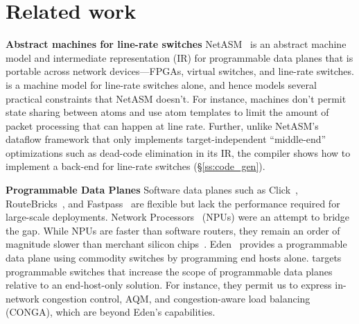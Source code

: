 \section{Related work}
\label{s:related}

\textbf{Abstract machines for line-rate switches}
NetASM~\cite{netasm} is an abstract machine model and intermediate
representation (IR) for programmable data planes that is portable across
network devices---FPGAs, virtual switches, and line-rate switches.  \absmachine
is a machine model for line-rate switches alone, and hence models several
practical constraints that NetASM doesn't. For instance, \absmachine machines
don't permit state sharing between atoms and use atom templates to limit the
amount of packet processing that can happen at line rate. Further, unlike
NetASM's dataflow framework that only implements target-independent
``middle-end'' optimizations such as dead-code elimination in its IR, the
\pktlanguage compiler shows how to implement a back-end for line-rate switches
(\S\ref{ss:code_gen}).

\textbf{Programmable Data Planes}
Software data planes such as Click~\cite{click},
RouteBricks~\cite{routebricks}, and Fastpass~\cite{fastpass} are flexible but
lack the performance required for large-scale deployments. Network
Processors~\cite{ixp2800, ixp4xx} (NPUs) were an attempt to bridge the gap.
While NPUs are faster than software routers, they remain an order of magnitude
slower than merchant silicon chips~\cite{rmt}. Eden~\cite{eden} provides a
programmable data plane using commodity switches by programming end hosts
alone. \pktlanguage targets programmable switches that increase the scope of
programmable data planes relative to an end-host-only solution. For instance,
they permit us to express in-network congestion control, AQM, and
congestion-aware load balancing (CONGA), which are beyond Eden's capabilities.

